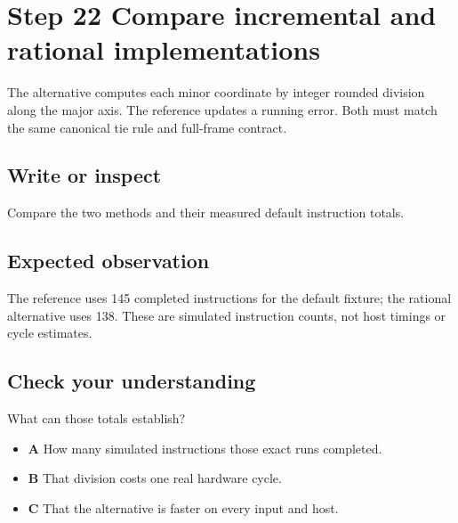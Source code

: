 \section{Step 22 Compare incremental and rational
  implementations}\label{007-bresenham-line-s22-step-22-compare-incremental-and-rational-implementations}

The alternative computes each minor coordinate by integer rounded
division along the major axis. The reference updates a running error.
Both must match the same canonical tie rule and full-frame contract.

\subsection{Write or
  inspect}\label{007-bresenham-line-s22-write-or-inspect}

Compare the two methods and their measured default instruction totals.

\subsection{Expected
  observation}\label{007-bresenham-line-s22-expected-observation}

The reference uses 145 completed instructions for the default fixture;
the rational alternative uses 138. These are simulated instruction
counts, not host timings or cycle estimates.

\subsection{Check your
  understanding}\label{007-bresenham-line-s22-check-your-understanding}

What can those totals establish?

\begin{itemize}
  \tightlist
  \item
        \textbf{A} How many simulated instructions those exact runs completed.
  \item
        \textbf{B} That division costs one real hardware cycle.
  \item
        \textbf{C} That the alternative is faster on every input and host.
\end{itemize}
